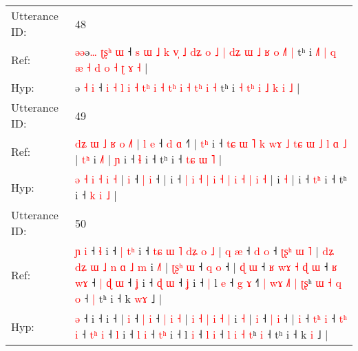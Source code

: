 \documentclass[10pt]{article}
\DeclareRobustCommand{\hl}[1]{{\textcolor{red}{#1}}}
\begin{document}
\begin{longtable}{ll}
 \\
\midrule
Utterance ID: & 48 \\
Ref: & \hl{ə}\hl{ə}ə\hl{…} \hl{ʈ}\hl{ʂ}\hl{ʰ} \hl{ɯ} ˧\hl{ }\hl{s} \hl{ɯ} \hl{˩} \hl{k} \hl{v}\hl{̩} \hl{˩} \hl{d}\hl{ʑ}\hl{ }\hl{o} \hl{˩} \hl{|} \hl{d}\hl{ʑ} \hl{ɯ} \hl{˩} \hl{ʁ}\hl{ }\hl{o} \hl{˩}\hl{˥} \hl{|} tʰ i\hl{ }\hl{˩}\hl{˥}\hl{ }\hl{|}\hl{ }\hl{q} \hl{æ} \hl{˧}\hl{ }\hl{d} \hl{o} \hl{˧} \hl{ʈ} \hl{ɤ} \hl{˧} |
 \\
Hyp: & \hl{}\hl{}ə\hl{} \hl{}\hl{}\hl{˧} \hl{i} ˧\hl{}\hl{} \hl{i} \hl{˧} \hl{l} \hl{}\hl{i} \hl{˧} \hl{}\hl{}\hl{t}\hl{ʰ} \hl{i} \hl{˧} \hl{t}\hl{ʰ} \hl{i} \hl{˧} \hl{}\hl{t}\hl{ʰ} \hl{}\hl{i} \hl{˧} tʰ i\hl{}\hl{}\hl{}\hl{}\hl{}\hl{}\hl{} \hl{˧} \hl{}\hl{t}\hl{ʰ} \hl{i} \hl{˩} \hl{k} \hl{i} \hl{˩} |
 \\
\midrule
Utterance ID: & 49 \\
Ref: & \hl{d}\hl{ʑ} \hl{ɯ} \hl{˩} \hl{ʁ} \hl{o} \hl{˩}\hl{˥} |\hl{ }\hl{l} \hl{e} ˧ \hl{d} \hl{ɑ} ˧\hl{˥} |\hl{ }\hl{t}\hl{ʰ} i ˧ \hl{t}\hl{ɕ} \hl{ɯ} \hl{˥} \hl{k} \hl{w}\hl{ɤ} \hl{˩} \hl{t}\hl{ɕ} \hl{ɯ} \hl{˩} \hl{l} \hl{ɑ} \hl{˩} |\hl{ }\hl{t}\hl{ʰ} i \hl{˩}\hl{˥} |\hl{ }\hl{ɲ} i ˧ \hl{}\hl{ɬ} i ˧ tʰ i ˧ \hl{t}\hl{ɕ} \hl{ɯ} \hl{˥} |
 \\
Hyp: & \hl{}\hl{ə} \hl{˧} \hl{i} \hl{˧} \hl{i} \hl{}\hl{˧} |\hl{}\hl{} \hl{i} ˧ \hl{|} \hl{i} ˧\hl{} |\hl{}\hl{}\hl{} i ˧ \hl{}\hl{|} \hl{i} \hl{˧} \hl{|} \hl{}\hl{i} \hl{˧} \hl{}\hl{|} \hl{i} \hl{˧} \hl{|} \hl{i} \hl{˧} |\hl{}\hl{}\hl{} i \hl{}\hl{˧} |\hl{}\hl{} i ˧ \hl{t}\hl{ʰ} i ˧ tʰ i ˧ \hl{}\hl{k} \hl{i} \hl{˩} |
 \\
\midrule
Utterance ID: & 50 \\
Ref: & \hl{ɲ}\hl{ }\hl{i} ˧\hl{ }\hl{ɬ} i ˧\hl{ }\hl{|}\hl{ }\hl{t}\hl{ʰ} i ˧\hl{ }\hl{t}\hl{ɕ}\hl{ }\hl{ɯ}\hl{ }\hl{˥}\hl{ }\hl{d}\hl{ʑ}\hl{ }\hl{o}\hl{ }\hl{˩} |\hl{ }\hl{q} \hl{æ} ˧ \hl{d} \hl{o} ˧ \hl{ʈ}\hl{ʂ}\hl{ʰ} \hl{ɯ} \hl{˥} |\hl{ }\hl{d}\hl{ʑ}\hl{ }\hl{d}\hl{ʑ} \hl{ɯ} \hl{˩} \hl{n} \hl{ɑ} \hl{˩} \hl{m} i \hl{˩}\hl{˥} |\hl{ }\hl{ʈ}\hl{ʂ}\hl{ʰ} \hl{ɯ} ˧ \hl{q} \hl{o} ˧ |\hl{ }\hl{ɖ} \hl{ɯ} ˧\hl{ }\hl{ʁ}\hl{ }\hl{w}\hl{ɤ} \hl{˧}\hl{ }\hl{ɖ} \hl{ɯ} ˧ \hl{ʁ}\hl{ }\hl{w}\hl{ɤ} ˧ \hl{|}\hl{ }\hl{ɖ} \hl{ɯ} ˧ \hl{ʝ} i ˧ \hl{ɖ} \hl{ɯ} ˧ \hl{}\hl{ʝ} i ˧\hl{ }\hl{|} l \hl{e} ˧ \hl{g} \hl{ɤ} ˧\hl{˥}\hl{ }\hl{|} \hl{w}\hl{ɤ} \hl{˩}\hl{˥} \hl{|} \hl{ʈ}\hl{ʂ}ʰ\hl{ }\hl{ɯ}\hl{ }\hl{˧}\hl{ }\hl{q} \hl{o} ˧\hl{ }\hl{|} tʰ i ˧ k \hl{w}\hl{ɤ} ˩ |
 \\
Hyp: & \hl{}\hl{}\hl{ə} ˧\hl{}\hl{} i ˧\hl{}\hl{}\hl{}\hl{}\hl{} i ˧\hl{}\hl{}\hl{}\hl{}\hl{}\hl{}\hl{}\hl{}\hl{}\hl{}\hl{}\hl{}\hl{}\hl{} |\hl{}\hl{} \hl{i} ˧ \hl{|} \hl{i} ˧ \hl{}\hl{}\hl{|} \hl{i} \hl{˧} |\hl{}\hl{}\hl{}\hl{}\hl{}\hl{} \hl{i} \hl{˧} \hl{|} \hl{i} \hl{˧} \hl{|} i \hl{}\hl{˧} |\hl{}\hl{}\hl{}\hl{} \hl{i} ˧ \hl{|} \hl{i} ˧ |\hl{}\hl{} \hl{i} ˧\hl{}\hl{}\hl{}\hl{}\hl{} \hl{}\hl{t}\hl{ʰ} \hl{i} ˧ \hl{t}\hl{ʰ}\hl{ }\hl{i} ˧ \hl{}\hl{t}\hl{ʰ} \hl{i} ˧ \hl{l} i ˧ \hl{l} \hl{i} ˧ \hl{t}\hl{ʰ} i ˧\hl{}\hl{} l \hl{i} ˧ \hl{l} \hl{i} ˧\hl{}\hl{}\hl{} \hl{}\hl{l} \hl{}\hl{i} \hl{˧} \hl{}\hl{t}ʰ\hl{}\hl{}\hl{}\hl{}\hl{}\hl{} \hl{i} ˧\hl{}\hl{} tʰ i ˧ k \hl{}\hl{i} ˩ |

\end{longtable}
\end{document}
